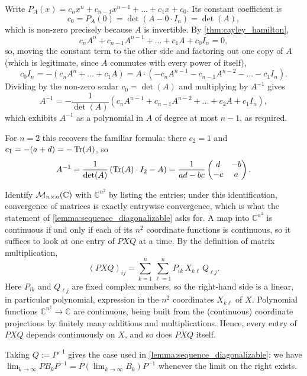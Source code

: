 \begin{exercisesolution}
\label{sol:cayley_inverse}
  Write $P_A(x) = c_n x^n + c_{n-1}x^{n-1} + \dots + c_1 x + c_0$. Its constant coefficient is
  \[ c_0 = P_A(0) = \det(A - 0 \cdot I_n) = \det(A), \]
  which is non-zero precisely because $A$ is invertible. By \cref{thm:cayley_hamilton},
  \[ c_n A^n + c_{n-1}A^{n-1} + \dots + c_1 A + c_0 I_n = 0, \]
  so, moving the constant term to the other side and factoring out one copy of $A$ (which is legitimate, since $A$ commutes with every power of itself),
  \[ c_0 I_n = -\left( c_n A^n + \dots + c_1 A \right) = A \cdot \left( -c_n A^{n-1} - c_{n-1}A^{n-2} - \dots - c_1 I_n \right). \]
  Dividing by the non-zero scalar $c_0 = \det(A)$ and multiplying by $A^{-1}$ gives
  \[ A^{-1} = -\frac{1}{\det(A)} \left( c_n A^{n-1} + c_{n-1} A^{n-2} + \dots + c_2 A + c_1 I_n \right), \]
  which exhibits $A^{-1}$ as a polynomial in $A$ of degree at most $n-1$, as required.

  For $n = 2$ this recovers the familiar formula: there $c_2 = 1$ and $c_1 = -(a+d) = -\operatorname{Tr}(A)$, so
  \[ A^{-1} = \frac{1}{\det(A)} \left( \operatorname{Tr}(A) \cdot I_2 - A \right) = \frac{1}{ad-bc} \begin{pmatrix} d & -b \\ -c & a \end{pmatrix}. \]
\end{exercisesolution}

\begin{exercisesolution}
\label{sol:conjugation_continuous}
  Identify $\mathcal{M}_{n \times n}(\mathbb{C})$ with $\mathbb{C}^{n^2}$ by listing the entries; under this identification, convergence of matrices is exactly entrywise convergence, which is what the statement of \cref{lemma:sequence_diagonalizable} asks for. A map into $\mathbb{C}^{n^2}$ is continuous if and only if each of its $n^2$ coordinate functions is continuous, so it suffices to look at one entry of $PXQ$ at a time. By the definition of matrix multiplication,
  \[ (P X Q)_{ij} = \sum_{k=1}^n \sum_{\ell=1}^n P_{ik} \, X_{k\ell} \, Q_{\ell j}. \]
  Here $P_{ik}$ and $Q_{\ell j}$ are fixed complex numbers, so the right-hand side is a linear, in particular polynomial, expression in the $n^2$ coordinates $X_{k\ell}$ of $X$. Polynomial functions $\mathbb{C}^{n^2} \to \mathbb{C}$ are continuous, being built from the (continuous) coordinate projections by finitely many additions and multiplications. Hence, every entry of $PXQ$ depends continuously on $X$, and so does $PXQ$ itself.

  Taking $Q := P^{-1}$ gives the case used in \cref{lemma:sequence_diagonalizable}: we have $\lim_{k \to \infty} P B_k P^{-1} = P \left( \lim_{k \to \infty} B_k \right) P^{-1}$ whenever the limit on the right exists.
\end{exercisesolution}

